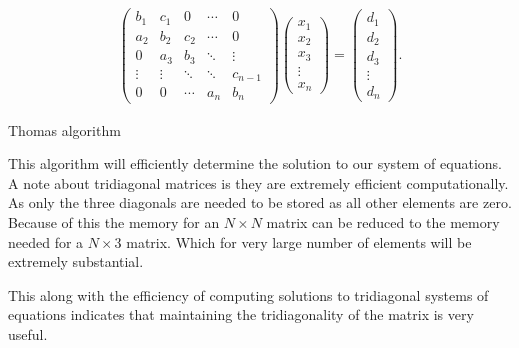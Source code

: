\documentclass[10pt]{amsart}
\numberwithin{equation}{section}
\theoremstyle{definition}
\begin{document}
\begin{multicols}{2}
\begin{align*}
  \begin{pmatrix}
    b_1 & c_1 & 0 & \cdots & 0 \\
    a_2 & b_2 & c_2 & \cdots & 0\\
    0 & a_3 & b_3 & \ddots & \vdots\\
    \vdots & \vdots & \ddots & \ddots & c_{n-1}\\
    0 & 0 & \cdots & a_n & b_n
  \end{pmatrix}
  \begin{pmatrix}
    x_1 \\ x_2 \\ x_3 \\ \vdots \\ x_n
  \end{pmatrix}
  =
  \begin{pmatrix}
    d_1 \\ d_2 \\ d_3 \\ \vdots \\ d_n
  \end{pmatrix}.
\end{align*}

\begin{algorithm}[H]
  \caption{Thomas algorithm}
  \begin{algorithmic}
    \EndIf
    \EndFor
    \Else
    \EndIf
    \EndFor
  \end{algorithmic}
\end{algorithm}

This algorithm will efficiently determine the solution to our system of
equations.  A note about tridiagonal matrices is they are extremely efficient
computationally. As only the three diagonals are needed to be stored as all
other elements are zero. Because of this the memory for an $N\times N$ matrix
can be reduced to the memory needed for a $N\times 3$ matrix. Which for very
large number of elements will be extremely substantial.

This along with the efficiency of computing solutions to tridiagonal systems of
equations indicates that maintaining the tridiagonality of the matrix is very
useful.


\end{multicols}
\end{document}
